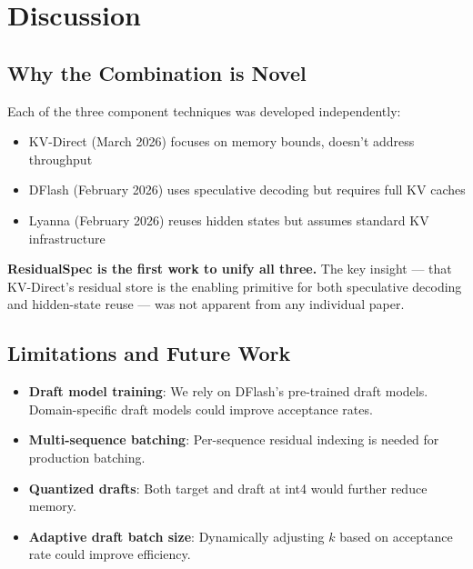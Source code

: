 \documentclass[11pt]{article}
\begin{document}
\section{Discussion}

\subsection{Why the Combination is Novel}

Each of the three component techniques was developed independently:
\begin{itemize}
    \item KV-Direct (March 2026) focuses on memory bounds, doesn't address throughput
    \item DFlash (February 2026) uses speculative decoding but requires full KV caches
    \item Lyanna (February 2026) reuses hidden states but assumes standard KV infrastructure
\end{itemize}

\textbf{ResidualSpec is the first work to unify all three.} The key insight — that KV-Direct's residual store is the enabling primitive for both speculative decoding and hidden-state reuse — was not apparent from any individual paper.

\subsection{Limitations and Future Work}

\begin{itemize}
    \item \textbf{Draft model training}: We rely on DFlash's pre-trained draft models. Domain-specific draft models could improve acceptance rates.
    \item \textbf{Multi-sequence batching}: Per-sequence residual indexing is needed for production batching.
    \item \textbf{Quantized drafts}: Both target and draft at int4 would further reduce memory.
    \item \textbf{Adaptive draft batch size}: Dynamically adjusting $k$ based on acceptance rate could improve efficiency.
\end{itemize}



\end{document}
